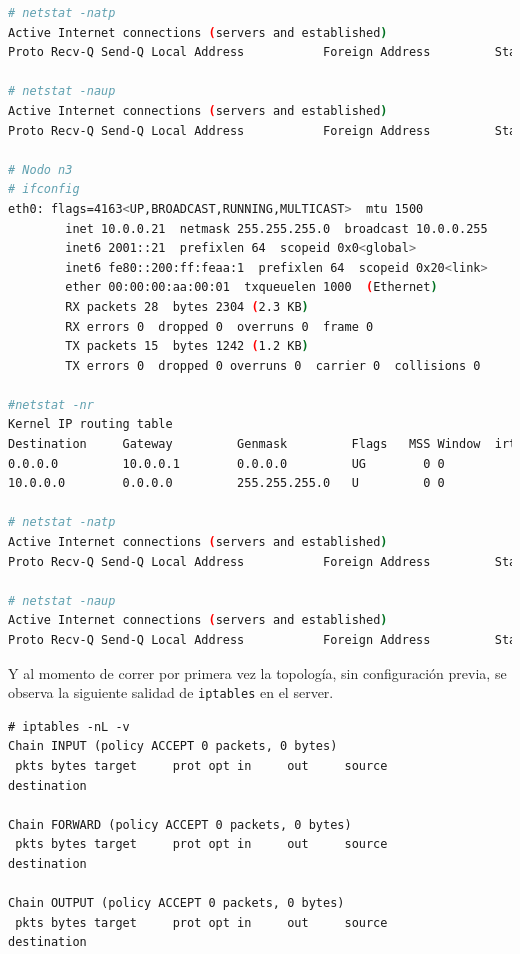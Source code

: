 \begin{lstlisting}[language=bash,breaklines=true]
# netstat -natp
Active Internet connections (servers and established)
Proto Recv-Q Send-Q Local Address           Foreign Address         State       PID/Program name    

# netstat -naup
Active Internet connections (servers and established)
Proto Recv-Q Send-Q Local Address           Foreign Address         State       PID/Program name

# Nodo n3
# ifconfig 
eth0: flags=4163<UP,BROADCAST,RUNNING,MULTICAST>  mtu 1500
        inet 10.0.0.21  netmask 255.255.255.0  broadcast 10.0.0.255
        inet6 2001::21  prefixlen 64  scopeid 0x0<global>
        inet6 fe80::200:ff:feaa:1  prefixlen 64  scopeid 0x20<link>
        ether 00:00:00:aa:00:01  txqueuelen 1000  (Ethernet)
        RX packets 28  bytes 2304 (2.3 KB)
        RX errors 0  dropped 0  overruns 0  frame 0
        TX packets 15  bytes 1242 (1.2 KB)
        TX errors 0  dropped 0 overruns 0  carrier 0  collisions 0

#netstat -nr
Kernel IP routing table
Destination     Gateway         Genmask         Flags   MSS Window  irtt Iface
0.0.0.0         10.0.0.1        0.0.0.0         UG        0 0          0 eth0
10.0.0.0        0.0.0.0         255.255.255.0   U         0 0          0 eth0

# netstat -natp
Active Internet connections (servers and established)
Proto Recv-Q Send-Q Local Address           Foreign Address         State       PID/Program name    

# netstat -naup
Active Internet connections (servers and established)
Proto Recv-Q Send-Q Local Address           Foreign Address         State       PID/Program name

\end{lstlisting}
\endgroup

Y al momento de correr por primera vez la topología, sin configuración previa, se observa la siguiente salidad de \texttt{iptables} en el server.

\begingroup
    \fontsize{9pt}{10pt}\selectfont
\begin{lstlisting}
# iptables -nL -v
Chain INPUT (policy ACCEPT 0 packets, 0 bytes)
 pkts bytes target     prot opt in     out     source               destination         

Chain FORWARD (policy ACCEPT 0 packets, 0 bytes)
 pkts bytes target     prot opt in     out     source               destination         

Chain OUTPUT (policy ACCEPT 0 packets, 0 bytes)
 pkts bytes target     prot opt in     out     source               destination         
\end{lstlisting}
\endgroup

